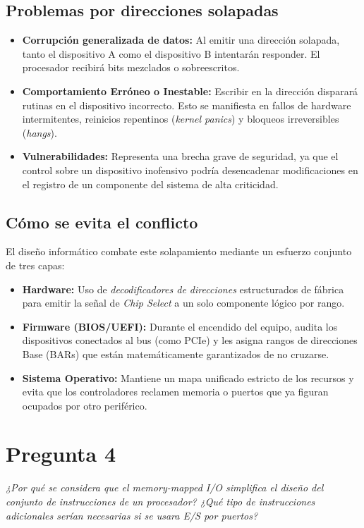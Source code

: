\documentclass[12pt,a4paper]{article}
\begin{document}
	\subsection{Problemas por direcciones solapadas}
	\begin{itemize}
		\item \textbf{Corrupción generalizada de datos:} Al emitir una dirección solapada, tanto el dispositivo A como el dispositivo B intentarán responder. El procesador recibirá bits mezclados o sobreescritos.
		\item \textbf{Comportamiento Erróneo o Inestable:} Escribir en la dirección disparará rutinas en el dispositivo incorrecto. Esto se manifiesta en fallos de hardware intermitentes, reinicios repentinos (\textit{kernel panics}) y bloqueos irreversibles (\textit{hangs}).
		\item \textbf{Vulnerabilidades:} Representa una brecha grave de seguridad, ya que el control sobre un dispositivo inofensivo podría desencadenar modificaciones en el registro de un componente del sistema de alta criticidad.
	\end{itemize}
	
	\subsection{Cómo se evita el conflicto}
	El diseño informático combate este solapamiento mediante un esfuerzo conjunto de tres capas:
	\begin{itemize}
		\item \textbf{Hardware:} Uso de \textit{decodificadores de direcciones} estructurados de fábrica para emitir la señal de \textit{Chip Select} a un solo componente lógico por rango.
		\item \textbf{Firmware (BIOS/UEFI):} Durante el encendido del equipo, audita los dispositivos conectados al bus (como PCIe) y les asigna rangos de direcciones Base (BARs) que están matemáticamente garantizados de no cruzarse.
		\item \textbf{Sistema Operativo:} Mantiene un mapa unificado estricto de los recursos y evita que los controladores reclamen memoria o puertos que ya figuran ocupados por otro periférico.
	\end{itemize}
	
	\section{Pregunta 4}
	\textit{¿Por qué se considera que el memory-mapped I/O simplifica el diseño del conjunto de instrucciones de un procesador? ¿Qué tipo de instrucciones adicionales serían necesarias si se usara E/S por puertos?}
	
\end{document}
